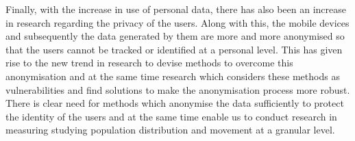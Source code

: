 
Finally, with the increase in use of personal data, there has also been an increase in research regarding the privacy of the users.
Along with this, the mobile devices and subsequently the data generated by them are more and more anonymised so that the users cannot be tracked or identified at a personal level.
This has given rise to the new trend in research to devise methods to overcome this anonymisation and at the same time research which considers these methods as vulnerabilities and find solutions to make the anonymisation process more robust. 
There is clear need for methods which anonymise the data sufficiently to protect the identity of the users and at the same time enable us to conduct research in
measuring studying population distribution and movement at a granular level.

